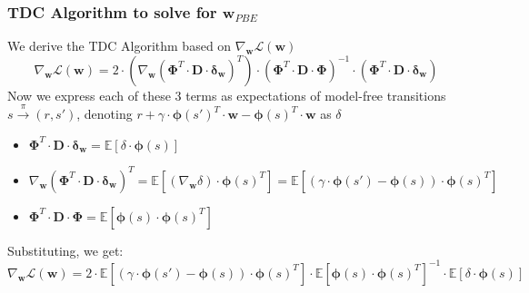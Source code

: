 \documentclass[handout]{beamer}
\newcommand{\bphi}{\bm{\Phi}}
\newcommand{\bd}{\bm{D}}
\newcommand{\bw}{\bm{w}}
\newcommand{\bdel}{\bm{\delta_w}}
\begin{document}
\begin{frame}
\frametitle{TDC Algorithm to solve for $\bm{w}_{PBE}$}
\pause
We derive the TDC Algorithm based on $\nabla_{\bw} \mathcal{L}({\bw})$
$$\nabla_{\bw} \mathcal{L}({\bw}) = 2 \cdot (\nabla_{\bw} (\bphi^T \cdot \bd \cdot \bdel)^T) \cdot (\bphi^T \cdot \bd \cdot \bphi)^{-1} \cdot (\bphi^T \cdot \bd \cdot \bdel)$$
\pause
Now we express each of these 3 terms as expectations of model-free transitions $s \stackrel{\pi}\longrightarrow (r,s')$, denoting $r + \gamma \cdot \bm{\phi}(s')^T \cdot \bw - \bm{\phi}(s)^T \cdot \bw$ as $\delta$
\pause
\begin{itemize}[<+->]
\item $\bphi^T \cdot \bd \cdot \bdel = \mathbb{E}[\delta \cdot \bm{\phi}(s)]$
\item $\nabla_{\bw} (\bphi^T \cdot \bd \cdot \bdel)^T = \mathbb{E}[(\nabla_{\bw} \delta) \cdot \bm{\phi}(s)^T] = \mathbb{E}[(\gamma \cdot \bm{\phi}(s') - \bm{\phi}(s)) \cdot \bm{\phi}(s)^T]$
\item $\bphi^T \cdot \bd \cdot \bphi = \mathbb{E}[\bm{\phi}(s) \cdot \bm{\phi}(s)^T]$
\end{itemize}
\pause
Substituting, we get:
$$\nabla_{\bw} \mathcal{L}({\bw}) = 2 \cdot  \mathbb{E}[(\gamma \cdot \bm{\phi}(s') - \bm{\phi}(s)) \cdot \bm{\phi}(s)^T] \cdot \mathbb{E}[\bm{\phi}(s) \cdot \bm{\phi}(s)^T]^{-1} \cdot \mathbb{E}[\delta \cdot \bm{\phi}(s)]$$
\end{frame}
\end{document}

